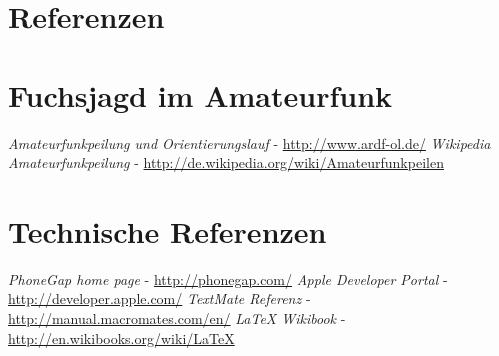 
\newpage
\section{Referenzen} %
\label{sec:referenzen}

\begin{thebibliography}{breitestes Label}

\section*{Fuchsjagd im Amateurfunk}
    \textit{Amateurfunkpeilung und Orientierungslauf} - \url{http://www.ardf-ol.de/}
    \textit{Wikipedia Amateurfunkpeilung} - \url{http://de.wikipedia.org/wiki/Amateurfunkpeilen}
\section*{Technische Referenzen}
    \textit{PhoneGap home page} - \url{http://phonegap.com/}
    \textit{Apple Developer Portal} - \url{http://developer.apple.com/}
    \textit{TextMate Referenz} - \url{http://manual.macromates.com/en/}
    \textit{LaTeX Wikibook} - \url{http://en.wikibooks.org/wiki/LaTeX}

\end{thebibliography}

